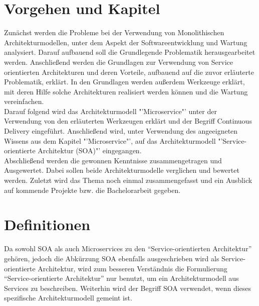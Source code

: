 \section{Vorgehen und Kapitel}
\label{sec:vorgehen}
Zunächst werden die Probleme bei der Verwendung von Monolithischen Architekturmodellen, unter dem Aspekt der Softwareentwicklung und Wartung analysiert. Darauf aufbauend soll die Grundlegende Problematik herausgearbeitet werden. Anschließend werden die Grundlagen zur Verwendung von Service orientierten Architekturen und deren Vorteile, aufbauend auf die zuvor erläuterte Problematik, erklärt. In den Grundlagen werden außerdem Werkzeuge erklärt, mit deren Hilfe solche Architekturen realisiert werden können und die Wartung vereinfachen.
\\
Darauf folgend wird das Architekturmodell "'Microservice"' unter der Verwendung von den erläuterten Werkzeugen erklärt und der Begriff Continuous Delivery eingeführt. Anschließend wird, unter Verwendung des angeeigneten Wissens aus dem Kapitel "'Microservice"', auf das Architekturmodell "'Service-orientierte Architektur (SOA)"' eingegangen.
\\
Abschließend werden die gewonnen Kenntnisse zusammengetragen und Ausgewertet. Dabei sollen beide Architekturmodelle verglichen und bewertet werden. Zuletzt wird das Thema noch einmal zusammengefasst und ein Ausblick auf kommende Projekte bzw. die Bachelorarbeit gegeben.

\section{Definitionen}
\label{sec:Definitionen}
Da sowohl SOA als auch Microservices zu den "`Service-orientierten Architektur"' gehören, jedoch die Abkürzung SOA ebenfalls ausgeschrieben wird als Service-orientierte Architektur, wird zum besseren Verständnis die Formulierung "`Service-orientierte Architektur"' nur benutzt, um ein Architekturmodell aus Services zu beschreiben. Weiterhin wird der Begriff SOA verwendet, wenn dieses spezifische Architekturmodell gemeint ist.